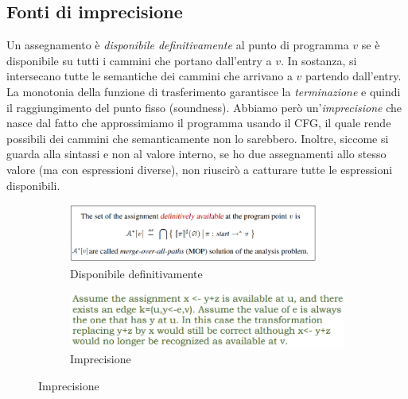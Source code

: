 \documentclass[a4paper,oneside,titlepage]{book}
\begin{document}
\subsection{Fonti di imprecisione}
Un assegnamento è \textit{disponibile definitivamente} al punto di programma $v$ se è disponibile su tutti i cammini che portano dall'entry a $v$. In sostanza, si intersecano tutte le semantiche dei cammini che arrivano a $v$ partendo dall'entry. La monotonia della funzione di trasferimento garantisce la \textit{terminazione} e quindi il raggiungimento del punto fisso (soundness). Abbiamo però un'\textit{imprecisione} che nasce dal fatto che approssimiamo il programma usando il CFG, il quale rende possibili dei cammini che semanticamente non lo sarebbero. Inoltre, siccome si guarda alla sintassi e non al valore interno, se ho due assegnamenti allo stesso valore (ma con espressioni diverse), non riuscirò a catturare tutte le espressioni disponibili.
\begin{figure}[htp]
	\begin{subfigure}{0.49\textwidth}
	    \centering
		\includegraphics[width=0.9\textwidth]{availExp6.png}
		\caption{Disponibile definitivamente}
	\end{subfigure}
	\hfill
	\begin{subfigure}{0.49\textwidth}
	    \centering
		\includegraphics[width=\textwidth, height=\textheight, keepaspectratio]{availExp7.png} 
		\caption{Imprecisione}
	\end{subfigure}
\end{figure}
\end{document}
